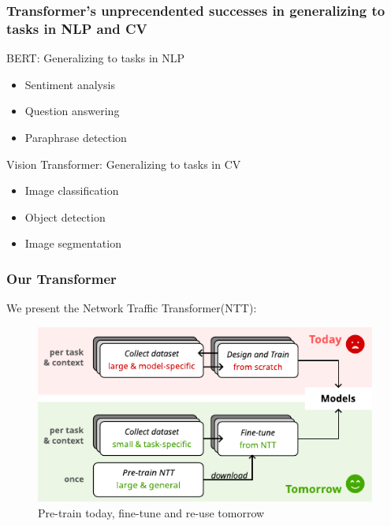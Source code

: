 \documentclass{beamer}
\begin{document}
\begin{frame}
\frametitle{Transformer's unprecendented successes in generalizing to tasks in NLP and CV}
\pause

BERT: Generalizing to tasks in NLP

\begin{itemize}  
    \item<1-> Sentiment analysis
    \item<1-> Question answering
    \item<1-> Paraphrase detection
\end{itemize}
\pause

Vision Transformer: Generalizing to tasks in CV

\begin{itemize}  
    \item<1-> Image classification
    \item<1-> Object detection
    \item<1-> Image segmentation
\end{itemize}



\end{frame}


\begin{frame}
\frametitle{Our Transformer}

We present the Network Traffic Transformer(NTT):
\pause

\begin{figure}[!hbt]
  \begin{center}
    \includegraphics[scale=1]{figures/vision.pdf}
    \caption{Pre-train today, fine-tune and re-use tomorrow}
    \label{fig:vision}
  \end{center}
\end{figure}
    
    
\end{frame}
\end{document}
